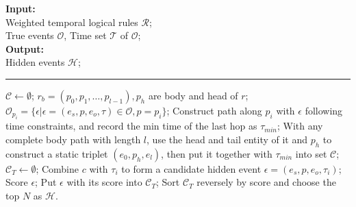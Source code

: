 \documentclass[a4paper, AutoFakeBold]{article}
\title{\mytitle}
\author{宋超}
\date{\today}
\begin{document}
\maketitle

\setcounter{page}{1}


\begin{algorithm}[!t]
	\caption{隐藏事件生成}\label{alg_heg}
	\textbf{Input:}\\
	\hspace*{2em}Weighted temporal logical rules $\mathcal{R}$;\\
	\hspace*{2em}True events $\mathcal{O}$, Time set $\mathcal{T}$ of $\mathcal{O}$;\\
	\textbf{Output:}\\
	\hspace*{2em}Hidden events $\mathcal{H}$;
	\vspace{0.3em}
	\hrule
	\vspace{0.3em}
	\begin{algorithmic}[1]
		\STATE $\mathcal{C}\leftarrow\emptyset$;
		\STATE $r_b=(p_0, p_1,\dots,p_{l-1}), p_h$ are body and head of $r$;
		\STATE $\mathcal{O}_{p_i}=\{\epsilon|\epsilon=(e_s,p,e_o,\tau)\in \mathcal{O},p=p_i\}$;
		\STATE Construct path along $p_i$ with $\epsilon$ following time constraints, and record the min time of the last hop as $\tau_{min}$;
		\ENDFOR
		\ENDFOR
		\STATE With any complete body path with length $l$, use the head and tail entity of it and $p_h$ to construct a static triplet $(e_0,p_h,e_{l})$, then put it together with $\tau_{min}$ into set $\mathcal{C}$;
		\ENDFOR
		\STATE $\mathcal{C}_T\leftarrow\emptyset$;
		\STATE Combine $c$ with $\tau_i$ to form a candidate hidden event $\epsilon=(e_s,p,e_o,\tau_i)$;
		\STATE Score $\epsilon$;
		\STATE Put $\epsilon$ with its score into $\mathcal{C}_T$;
		\ENDFOR
		\ENDFOR
		\STATE Sort $\mathcal{C}_T$ reversely by score and choose the top $N$ as $\mathcal{H}$.
	\end{algorithmic}
\end{algorithm}
\end{document}
